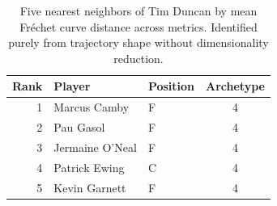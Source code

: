 \begin{table}[htbp]
  \centering\small
  \begin{tabular}{rllc}
    \toprule
    Rank & Player & Position & Archetype \\
    \midrule
    1 & Marcus Camby & F & 4 \\
    2 & Pau Gasol & F & 4 \\
    3 & Jermaine O'Neal & F & 4 \\
    4 & Patrick Ewing & C & 4 \\
    5 & Kevin Garnett & F & 4 \\
    \bottomrule
  \end{tabular}
  \caption{Five nearest neighbors of Tim Duncan by mean Fr\'{e}chet curve distance across metrics. Identified purely from trajectory shape without dimensionality reduction.}
  \label{tab:Tim_Duncan_frechet_curve_neighbors}
\end{table}

